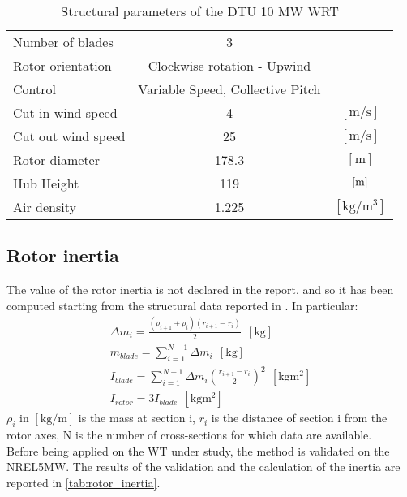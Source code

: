 \begin{table}[htb]
    \caption{Structural parameters of the DTU 10 MW \acrshort{WRT}}
    \centering
    \begin{tabular}{lcc}
    \toprule
    Number of blades & 3 & \\
    Rotor orientation & Clockwise rotation - Upwind & \\
    Control & Variable Speed, Collective Pitch & \\
    Cut in wind speed & 4 & $\left[\si{\meter \per \second}\right]$ \\
    Cut out wind speed & 25 & $\left[\si{\meter \per \second}\right]$ \\
    Rotor diameter & 178.3 & $\left[\si{\meter}\right]$\\
    Hub Height & 119 & $\left[\si{\meter}\right]$\\
    Air density & 1.225 & $\left[\si{\kilo\gram\per\cubic\meter}\right]$\\
    \bottomrule
    \end{tabular}
    \label{tab:DTU_10_struct}
\end{table}

\subsection{Rotor inertia}
The value of the rotor inertia is not declared in the report, and so it has been computed starting from the structural data reported in \cite{DTU_Wind_Energy_Report-I-0092}. In particular:
\begin{gather}
    \Delta m_i=\frac{\left(\rho_{i+1} + \rho_i\right)\left(r_{i+1} - r_i\right)}{2} \ \ \left[\si{\kilo\gram}\right] \\
    m_{blade} = \sum_{i=1}^{N-1}\Delta m_i \ \ \left[\si{\kilo\gram}\right]\\
    I_{blade}=\sum_{i=1}^{N-1}\Delta m_i\left(\frac{r_{i+1} - r_i}{2}\right)^2 \ \ \left[\si{\kilo\gram\square\meter}\right]\\
    I_{rotor}=3I_{blade} \ \ \left[\si{\kilo\gram\square\meter}\right]
\end{gather}
$\rho_i$ in $ \left[\si{\kilo\gram\per\meter}\right]$ is the mass at section i, $r_i$ is the distance of section i from the rotor axes, N is the number of cross-sections for which data are available.\\
Before being applied on the \acrshort{WT} under study, the method is validated on the NREL5MW. The results of the validation and the calculation of the inertia are reported in \autoref{tab:rotor_inertia}.

